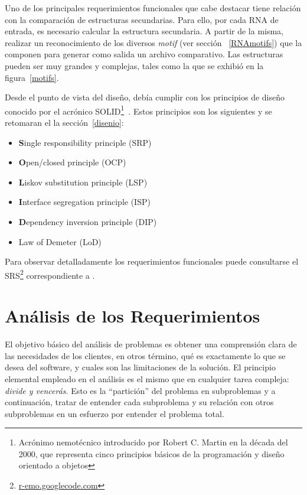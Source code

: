\par Uno de los principales requerimientos funcionales que cabe destacar tiene relación con la comparación de estructuras secundarias. Para ello, por cada RNA de entrada, es necesario calcular la estructura secundaria. A partir de la misma, realizar un reconocimiento de los diversos \emph{motif} (ver sección ~\ref{RNAmotifs}) que la componen para generar como salida un archivo comparativo. Las estructuras pueden ser muy grandes y complejas, tales como la que se exhibió en la figura~\ref{motifs}.

\par Desde el punto de vista del diseño, \remo debía cumplir con los principios de diseño conocido por el acrónico SOLID\footnote{Acrónimo nemotécnico introducido por Robert C. Martin en la década del 2000, que representa cinco principios básicos de la programación y diseño orientado a objetos}~\cite{Martin00}. Estos principios son los siguientes y se retomaran el la sección~\ref{disenio}:
\begin{itemize}
	\item \textbf{S}ingle responsibility principle (SRP)
	\item \textbf{O}pen/closed principle (OCP)
	\item \textbf{L}iskov substitution principle (LSP)
	\item \textbf{I}nterface segregation principle (ISP)
	\item \textbf{D}ependency inversion principle (DIP)	
	\item Law of Demeter (LoD)
\end{itemize}

\par Para observar detalladamente los requerimientos funcionales puede consultarse el SRS\footnote{\url{r-emo.googlecode.com}} correspondiente a \remo.

\section{Análisis de los Requerimientos}
\par El objetivo básico del análisis de problemas es obtener una comprensión clara de las necesidades de los clientes, en otros término, qué es exactamente lo que se desea del software, y cuales son las limitaciones de la solución. El principio elemental empleado en el análisis es el mismo que en cualquier tarea compleja: \emph{divide y vencerás}. Esto es la “partición” del problema en subproblemas y a continuación, tratar de entender cada subproblema y su relación con otros subproblemas en un esfuerzo por entender el problema total.


